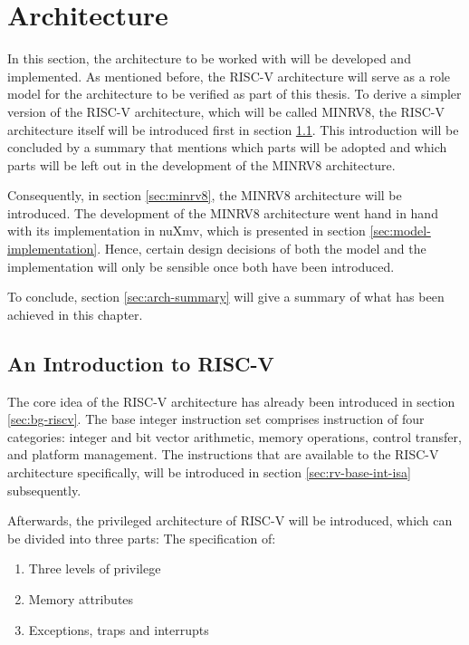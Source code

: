 
\chapter{Architecture}
\label{chp:arch}

In this section, the architecture to be worked with will be developed and implemented.
As mentioned before, the RISC-V architecture will serve as a role model for the architecture to be verified as part of this thesis.
To derive a simpler version of the RISC-V architecture, which will be called MINRV8, the RISC-V architecture itself will be introduced first in section \ref{sec:risc-v}.
This introduction will be concluded by a summary that mentions which parts will be adopted and which parts will be left out in the development of the MINRV8 architecture.

Consequently, in section \ref{sec:minrv8}, the MINRV8 architecture will be introduced.
The development of the MINRV8 architecture went hand in hand with its implementation in nuXmv, which is presented in section \ref{sec:model-implementation}.
Hence, certain design decisions of both the model and the implementation will only be sensible once both have been introduced.

To conclude, section \ref{sec:arch-summary} will give a summary of what has been achieved in this chapter.

\section{An Introduction to RISC-V}
\label{sec:risc-v}

The core idea of the RISC-V architecture has already been introduced in section \ref{sec:bg-riscv}.
The base integer instruction set comprises instruction of four categories: integer and bit vector arithmetic, memory operations, control transfer, and platform management.
The instructions that are available to the RISC-V architecture specifically, will be introduced in section \ref{sec:rv-base-int-isa} subsequently.

Afterwards, the privileged architecture of RISC-V will be introduced, which can be divided into three parts:
The specification of:
\begin{enumerate}
    \item Three levels of privilege
    \item Memory attributes
    \item Exceptions, traps and interrupts
\end{enumerate}

